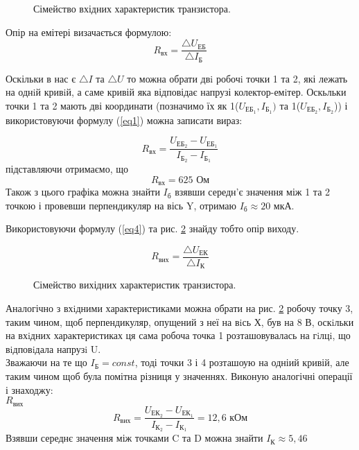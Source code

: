 \documentclass[a4paper,14pt]{extreport}
\begin{document}
\begin{figure}[h]
\caption{Сімейство вхідних характеристик транзистора.}
\label{ris:image5}
\end{figure}
Опір на емітері визачається формулою:
\begin{equation}\label{eq1}
R_{\text{вх}} = \dfrac{\triangle U_{\text{ЕБ}}}{\triangle I_{\text{Б}}}
\end{equation}


Оскільки в нас є $\triangle I$ та $\triangle U$ то можна обрати двi робочi точки 1 та 2, які лежать на однiй кривiй, а саме кривій яка відповідає напрузі колектор-емiтер. Оскьльки точки 1 та 2 мають дві координати (позначимо їх як 1($U_{\text{ЕБ$_1$}}, I_{\text{Б$_1$}})$ та 1($U_{\text{ЕБ$_2$}}, I_{\text{Б$_2$}}$)) і використовуючи формулу (\ref{eq1}) можна записати вираз:

\begin{equation}\label{eq2}
R_{\text{вх}} = \dfrac{U_{\text{ЕБ$_2$}} - U_{\text{ЕБ$_1$}}}{ I_{\text{Б$_2$}} -  I_{\text{Б$_1$}}}
\end{equation}
підставляючи отримаємо, що
\begin{equation}\label{eq3}
R_{\text{вх}} = 625 \text{ Ом}
\end{equation}
Також з цього графіка можна знайти $I_{\text{б}}$ взявши середн'є значення між 1 та 2 точкою і провевши перпендикуляр на вісь Y, отримаю $I_{\text{б}} \approx 20  \text{ мкА}$.

\newpage
Використовуючи формулу (\ref{eq4}) та рис. \ref{ris:image5} знайду тобто опір виходу.

\begin{equation}\label{eq4}
R_{\text{вих}} = \dfrac{\triangle U_{\text{ЕК}}}{\triangle I_{\text{К}}}
\end{equation}

\begin{figure}[h]
\caption{Сімейство вихідних характеристик транзистора.}
\label{ris:image5}
\end{figure}


Аналогічно з вхiдними характеристиками можна обрати на рис. \ref{ris:image5}
 робочу точку 3, таким чином, щоб перпендикуляр, опущений з неї на вiсь Х, був на 8 В, оскiльки на вхiдних характеристиках ця сама робоча точка 1 розташовувалась на гiлцi, що вiдповiдала напрузi U. \\
Зважаючи на те що $I_{\text{Б}} = const$, тоді точки 3 і 4 розташоую на одніий кривій, але таким чином щоб була помітна різниця у значеннях.
Виконую аналогічні операції і знаходжу:\\
 $R_{\text{вих}}$
\begin{equation}\label{eq5}
R_{\text{вих}} = \dfrac{U_{\text{ЕК$_2$}} - U_{\text{ЕК$_1$}}}{ I_{\text{К$_2$}} - I_{\text{К$_1$}}} = 12,6 \text{ кОм}
\end{equation}
Взявши середнє значення між точками C та D можна знайти $I_{\text{К}}\approx 5,46$
\end{document}
